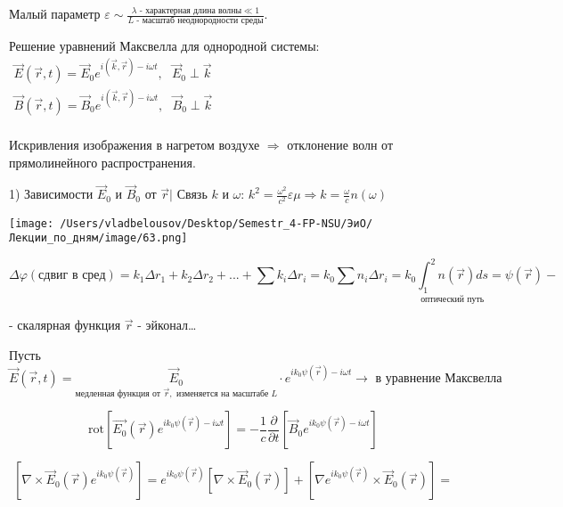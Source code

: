\documentclass[12pt, a4paper]{report}
\begin{document}
Малый параметр \(\displaystyle  \varepsilon \sim  \frac{ \lambda\text{ - характерная длина волны} \ll 1  }{L \text{  - масштаб неоднородности среды}}   \).

Решение уравнений Максвелла для однородной системы: \( \begin{aligned}
\vec{E } (\vec{r },t     ) = \vec{E }_0  e^{i (\vec{k } ,\vec{r}) - i \omega t  }  , \text{  }  \vec{E }_0 \perp \vec{k } \\
\vec{B } (\vec{r },t     ) = \vec{B }_0  e^{i (\vec{k } ,\vec{r}) - i \omega t  }  , \text{  }  \vec{B }_0 \perp \vec{k } \\
\end{aligned} \) 


Искривления изображения в нагретом воздухе \( \Rightarrow \)  отклонение волн от прямолинейного распространения.

1) Зависимости \( \vec{E } _0  \) и \( \vec{B } _0  \) от \( \vec{r } | \)  Связь \( k \) и \( \omega \): \( \displaystyle  k ^2 = \frac{ \omega ^2 } { c ^2 }\varepsilon \mu \Rightarrow k = \frac{\omega }{c } n(\omega)   \) 

\begin{center}
    \texttt{[image: /Users/vladbelousov/Desktop/Semestr\_4-FP-NSU/ЭиО/Лекции\_по\_дням/image/63.png]}
\end{center}

\[ \Delta \varphi (\text{сдвиг в сред} ) = k_1 \Delta r_1 + k_2 \Delta r_2 +... + \sum  k_i \Delta r_i = k_0 \sum n_i \Delta r_i = k_0 \underset{\text{оптический путь} }{\int_{1 }^{2 } n(\vec{r } )ds }= \psi (\vec{r} ) -\] 

- скалярная функция \( \vec{r}  \) - эйконал\dots

Пусть \( \vec{E } ( \vec{r } ,t ) = \underset{\text{медленная функция от  } \vec{r } , \text{ изменяется на масштабе } L  }{\vec{E } _0 } \cdot e^{ i k_0 \psi (\vec{r } ) - i \omega t}  \to  \text{ в уравнение Максвелла} \) 

\[ \mathrm{rot } \left[ \vec{E_0 }(\vec{r } ) e^{i k_0 \psi (\vec{r } )- i \omega t }   \right] = -\frac{1}{c} \frac{\partial  }{\partial  t } \left[ \vec{B }_0 e^{i k_0 \psi (\vec{r } )- i \omega t}   \right]   \] 

\[ \left[ \nabla \times  \vec{E } _0 ( \vec{r } ) e^{i k_0 \psi (\vec{r} )}  \right] = e^{ i k_0 \psi (\vec{r} )} \left[ \nabla \times  \vec{E } _0 (\vec{r } ) \right] + \left[ \nabla e^{ i k_0 \psi (\vec{r } )} \times  \vec{E }  _ 0 (\vec{r} )  \right] = \] 
\end{document}
